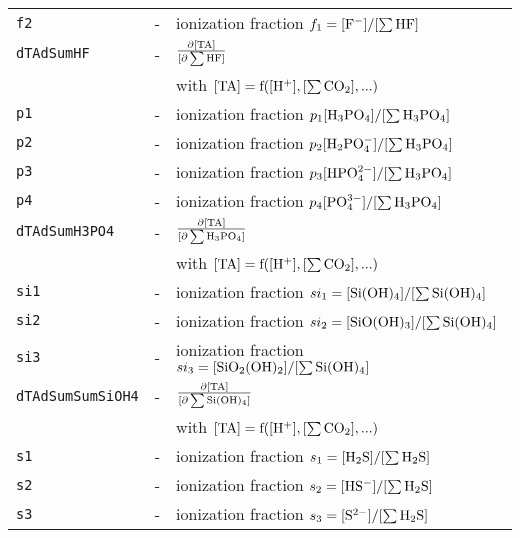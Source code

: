 \documentclass[article,nojss]{jss}
\begin{document}
\begin{footnotesize}
\begin{longtable}{l|l|p{7cm}}
\texttt{f2}          & -                               & ionization fraction $f_1 = [\rm F^-]/[\rm \sum HF]$\\               
\texttt{dTAdSumHF}   & -                               & $\rm \frac{\partial [TA]}{[\partial \sum HF]}$\\
            &                                 & with $\rm [TA] = f([H^+], [\sum CO_2], ...)$\\    
\texttt{p1}         & -                                 & ionization fraction $p_1 [\rm H_3PO_4]/[\rm \sum H_3PO_4]$\\
\texttt{p2}         & -                                & ionization fraction $p_2 [\rm H_2PO_4^-]/[\rm \sum H_3PO_4]$\\
\texttt{p3}        & -                                & ionization fraction $p_3 [\rm HPO_4^{2-}]/[\rm \sum H_3PO_4]$\\
\texttt{p4}         & -                                & ionization fraction $p_4 [\rm PO_4^{3-}]/[\rm \sum H_3PO_4]$\\
\texttt{dTAdSumH3PO4}   & -                               & $\rm \frac{\partial [TA]}{[\partial \sum H_3PO_4]}$\\
                   &                                  & with $\rm [TA] = f([H^+], [\sum CO_2], ...)$\\        
\texttt{si1}        & -                               & ionization fraction $si_1 = [\rm Si(OH)_4]  / [\rm \sum Si(OH)_4]$\\
\texttt{si2}        & -                               & ionization fraction $si_2 = [\rm SiO(OH)_3]  / [\rm \sum Si(OH)_4]$\\
\texttt{si3}        & -                               & ionization fraction $si_3 = [\rm SiO_2(OH)_2]  / [\rm \sum Si(OH)_4]$\\
\texttt{dTAdSumSumSiOH4}   & -                               & $\rm \frac{\partial [TA]}{[\partial \sum Si(OH)_4]}$\\
                   &                                  & with $\rm [TA] = f([H^+], [\sum CO_2], ...)$\\        
\texttt{s1}       & -                                & ionization fraction $s_1 = [\rm H_2S]  / [\rm \sum H_2S]$\\
\texttt{s2}       & -                                & ionization fraction $s_2 = [\rm HS^-]  / [\rm \sum H_2S]$\\
\texttt{s3}       & -                                & ionization fraction $s_3 = [\rm S^{2-}]  / [\rm \sum H_2S]$ \\

\end{longtable}
\end{footnotesize}
\end{document}
